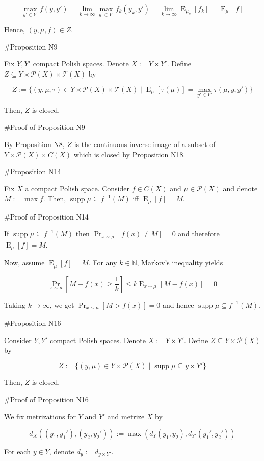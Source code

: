 \documentclass[a4paper]{article}
\DeclareMathOperator{\Supp}{supp}
\DeclareMathOperator{\Prb}{Pr}
\DeclareMathOperator{\E}{E}
\newcommand{\Nats}{\mathbb{N}}
\newcommand{\Prob}{\mathcal{P}}
\newcommand{\T}{\mathcal{T}}
\begin{document}
$$\max_{y' \in Y'} f(y,y') = \lim_{k \rightarrow \infty} \max_{y' \in Y'} f_k(y_k,y')= \lim_{k \rightarrow \infty} \E_{\mu_k}[f_k] = \E_{\mu}[f]$$

Hence, ${(y,\mu,f) \in Z}$.

\#Proposition N9

Fix ${Y,Y'}$ compact Polish spaces. Denote ${X:=Y \times Y'}$. Define ${Z \subseteq Y \times \Prob(X) \times \T(X)}$ by

$$Z:=\{(y,\mu,\tau) \in Y \times \Prob(X) \times \T(X) \mid \E_\mu[\tau(\mu)] = \max_{y' \in Y'} \tau(\mu,y,y')\}$$

Then, ${Z}$ is closed.

\#Proof of Proposition N9

By Proposition N8, ${Z}$ is the continuous inverse image of a subset of ${Y \times \Prob(X) \times C(X)}$ which is closed by Proposition N18.

\#Proposition N14

Fix ${X}$ a compact Polish space. Consider ${f \in C(X)}$ and ${\mu \in \Prob(X)}$ and denote ${M := \max f}$. Then, ${\Supp \mu \subseteq f^{-1}(M)}$ iff ${\E_\mu[f] = M}$.

\#Proof of Proposition N14

If ${\Supp \mu \subseteq f^{-1}(M)}$ then $\Prb_{x\sim \mu}[f(x) \ne M] = 0$ and therefore ${\E_\mu[f] = M}$.

Now, assume ${\E_\mu[f] = M}$. For any ${k \in \Nats}$, Markov's inequality yields 

$$\Prb_{x\sim \mu}[M - f(x) \geq \frac{1}{k}] \leq k\E_{x \sim \mu}[M - f(x)] = 0$$

Taking $k \rightarrow \infty$, we get ${\Prb_{x\sim \mu}[M > f(x)] = 0}$ and hence ${\Supp \mu \subseteq f^{-1}(M)}$.

\#Proposition N16

Consider ${Y,Y'}$ compact Polish spaces. Denote ${X:=Y \times Y'}$. Define ${Z \subseteq Y \times \Prob(X)}$ by

$$Z:=\{(y,\mu) \in Y \times \Prob(X) \mid \Supp \mu \subseteq y \times Y'\}$$

Then, ${Z}$ is closed.

\#Proof of Proposition N16

We fix metrizations for ${Y}$ and ${Y'}$ and metrize ${X}$ by 

$${d_X((y_1,y_1'),(y_2,y_2')):=\max(d_Y(y_1,y_2),d_{Y'}(y_1',y_2'))}$$

For each ${y \in Y}$, denote ${d_{y}:=d_{y \times Y'}}$.
\end{document}

